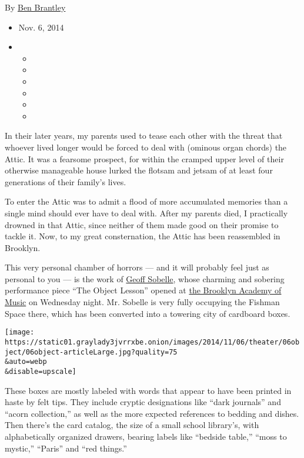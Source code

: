 By \href{http://www.nytimes3xbfgragh.onion/by/ben-brantley}{Ben
Brantley}

\begin{itemize}
\item
  Nov. 6, 2014
\item
  \begin{itemize}
  \item
  \item
  \item
  \item
  \item
  \item
  \end{itemize}
\end{itemize}

In their later years, my parents used to tease each other with the
threat that whoever lived longer would be forced to deal with (ominous
organ chords) the Attic. It was a fearsome prospect, for within the
cramped upper level of their otherwise manageable house lurked the
flotsam and jetsam of at least four generations of their family's lives.

To enter the Attic was to admit a flood of more accumulated memories
than a single mind should ever have to deal with. After my parents died,
I practically drowned in that Attic, since neither of them made good on
their promise to tackle it. Now, to my great consternation, the Attic
has been reassembled in Brooklyn.

This very personal chamber of horrors --- and it will probably feel just
as personal to you --- is the work of
\href{https://twitter.com/rainpan}{Geoff Sobelle}, whose charming and
sobering performance piece ``The Object Lesson'' opened at
\href{http://www.bam.org/theater/2014/the-object-lesson}{the Brooklyn
Academy of Music} on Wednesday night. Mr. Sobelle is very fully
occupying the Fishman Space there, which has been converted into a
towering city of cardboard boxes.

\texttt{[image: https://static01.graylady3jvrrxbe.onion/images/2014/11/06/theater/06object/06object-articleLarge.jpg?quality=75\\\&auto=webp\\\&disable=upscale]}

These boxes are mostly labeled with words that appear to have been
printed in haste by felt tips. They include cryptic designations like
``dark journals'' and ``acorn collection,'' as well as the more expected
references to bedding and dishes. Then there's the card catalog, the
size of a small school library's, with alphabetically organized drawers,
bearing labels like ``bedside table,'' ``moss to mystic,'' ``Paris'' and
``red things.''

